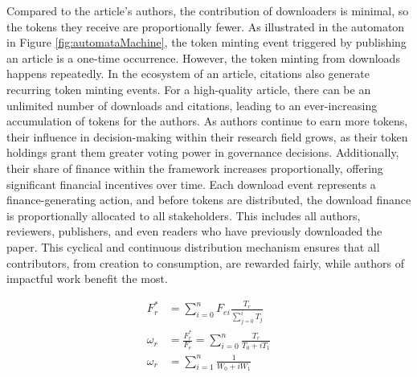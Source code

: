 \documentclass[lettersize,journal]{IEEEtran}
\begin{document}
Compared to the article's authors, the contribution of downloaders is minimal, so the tokens they receive are proportionally fewer. As illustrated in the automaton in Figure \ref{fig:automataMachine}, the token minting event triggered by publishing an article is a one-time occurrence. However, the token minting from downloads happens repeatedly. In the ecosystem of an article, citations also generate recurring token minting events. For a high-quality article, there can be an unlimited number of downloads and citations, leading to an ever-increasing accumulation of tokens for the authors. As authors continue to earn more tokens, their influence in decision-making within their research field grows, as their token holdings grant them greater voting power in governance decisions. Additionally, their share of finance within the framework increases proportionally, offering significant financial incentives over time. Each download event represents a finance-generating action, and before tokens are distributed, the download finance is proportionally allocated to all stakeholders. This includes all authors, reviewers, publishers, and even readers who have previously downloaded the paper. This cyclical and continuous distribution mechanism ensures that all contributors, from creation to consumption, are rewarded fairly, while authors of impactful work benefit the most.




\begin{equation}
  \begin{aligned}
    F_{r}^*  & = \sum_{i=0}^{n} F_{ei} \frac{T_{r}}{\sum_{j=0}^{i}T_j}           \\
    \omega_r & = \frac{F_{r}^*}{F_{e}} = \sum_{i=0}^{n} \frac{T_{r}}{T_0 + iT_1} \\
    \omega_r & = \sum_{i = 1}^{n} \frac{1}{W_0 + i W_1}
  \end{aligned}
  \label{eq:breakeven}
\end{equation}
\end{document}
